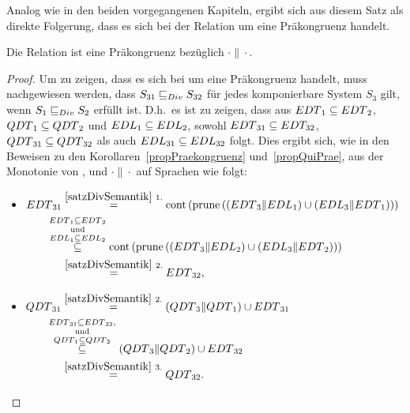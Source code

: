 Analog wie in den beiden vorgegangenen Kapiteln, ergibt sich aus diesem Satz
als direkte Folgerung, dass es sich bei der Relation \DRel{} um eine
Präkongruenz handelt.

\begin{kor}
\label{propDivPrae}
  Die Relation \DRel{} ist eine Präkongruenz bezüglich $\cdot\|\cdot$.
\end{kor}

\begin{proof}
  Um zu zeigen, dass es sich bei \DRel{} um eine Präkongruenz handelt, muss
  nachgewiesen werden, dass $S_{31}\sqsubseteq _{Div}{} S_{32}$ für jedes komponierbare
  System $S_3$ gilt, wenn $S_1\sqsubseteq _{Div}{} S_2$ erfüllt ist.  D.h.\ es ist
  zu zeigen, dass aus $EDT{}_1\subseteq EDT{}_2$, $QDT{}_1\subseteq
  QDT{}_2$ und $EDL{}_1\subseteq EDL{}_2$, sowohl $EDT{}_{31}\subseteq
  EDT_{32}$, $QDT{}_{31}\subseteq QDT{}_{32}$ als auch $EDL{}_{31}\subseteq
  EDL{}_{32}$ folgt. Dies ergibt sich, wie in den Beweisen zu den
  Korollaren~\ref{propPraekongruenz} und~\ref{propQuiPrae}, aus der
  Monotonie von \cont{}, \prune{} und $\cdot\|\cdot$ auf Sprachen wie folgt:
  \begin{itemize}
    \item $\begin{aligned}[t]
        \EDT{}_{31} &\overset{\ref{satzDivSemantik}~1.}{=}
        \cont{}\left(\prune{}\left(\left(\EDT{}_3\|\EDL{}_1\right) \cup
        \left(\EDL{}_3\|\EDT{}_1\right)\right)\right)\\
        &\hspace{-0.5cm}\overset{\EDT{}_1\subseteq
      \EDT{}_2}{\overset{\mathrm{und}}{\overset{\EDL{}_1\subseteq
    \EDL{}_2}{\subseteq}}}
    \cont{}\left(\prune{}\left(\left(\EDT{}_3\|\EDL{}_2\right) \cup
        \left(\EDL{}_3\|\EDT{}_2\right)\right)\right)\\
      &\overset{\ref{satzDivSemantik}~2.}{=} \EDT{}_{32},
    \end{aligned}$
    \item $\begin{aligned}[t]
        \QDT{}_{31} &\overset{\ref{satzDivSemantik}~2.}{=} (\QDT{}_3\|\QDT{}_1)
        \cup \EDT{}_{31}\\
        &\hspace{-0.5cm}\overset{\EDT{}_{31}\subseteq
      \EDT{}_{32},}{\overset{\mathrm{und}}{\overset{\QDT{}_1\subseteq
      \QDT{}_2}{\subseteq}}} (\QDT{}_3\|\QDT{}_2) \cup \EDT{}_{32}\\
      &\overset{\ref{satzDivSemantik}~3.}{=} \QDT{}_{32}.
    \end{aligned}$
  \end{itemize}
\end{proof}

